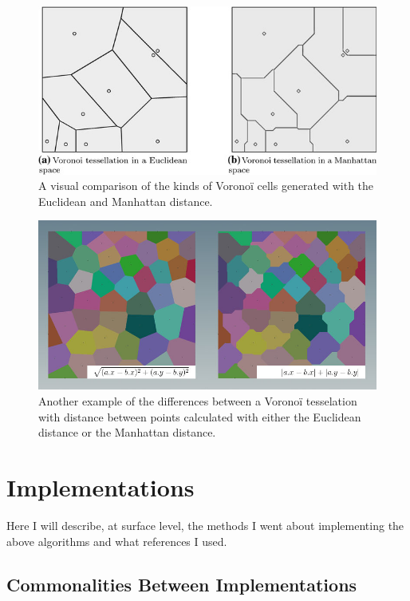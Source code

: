 \begin{figure}[H]
    \centering
    \includegraphics{Images/Voronoitessellations.jpg}
    \caption{A visual comparison of the kinds of Voronoï cells generated with the Euclidean and Manhattan distance.\cite{reffortesselations}}
    \label{fig:voronoicomparison}
\end{figure}

\begin{figure}[H]
    \centering
    \includegraphics[width=\textwidth]{Images/manhattan_example_02.jpg}
    \caption{Another example of the differences between a Voronoï tesselation with distance between points calculated with either the Euclidean distance or the Manhattan distance.\cite{manvoronoi}}
    \label{fig:secondvoronoicomparison}
\end{figure}

\section{Implementations}

Here I will describe, at surface level, the methods I went about implementing the above algorithms and what references I used.

\subsection{Commonalities Between Implementations}

